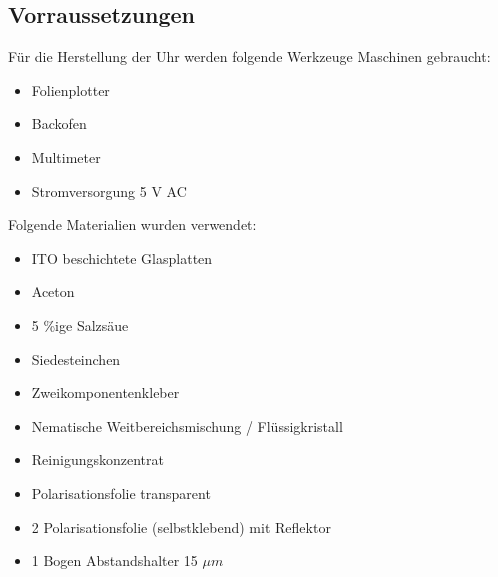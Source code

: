 \subsection{Vorraussetzungen}
Für die Herstellung der Uhr werden folgende Werkzeuge Maschinen gebraucht:
\begin{itemize}
\item Folienplotter
\item Backofen
\item Multimeter
\item Stromversorgung 5 V AC

\end{itemize}
Folgende Materialien wurden verwendet:
\begin{itemize}
\item ITO beschichtete Glasplatten
\item Aceton
\item 5 \%ige Salzsäue
\item Siedesteinchen
\item Zweikomponentenkleber
\item Nematische Weitbereichsmischung / Flüssigkristall
\item Reinigungskonzentrat
\item Polarisationsfolie transparent
\item 2 Polarisationsfolie (selbstklebend) mit Reflektor
\item 1 Bogen Abstandshalter 15 \(\mu m\)
\end{itemize}